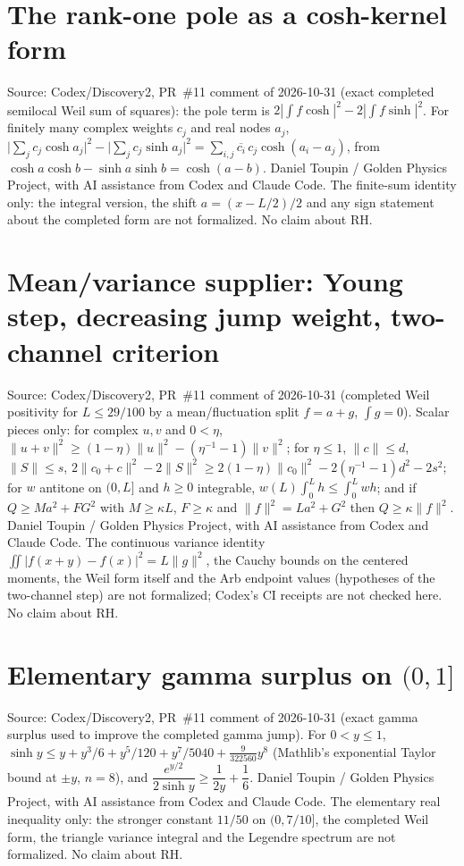 \documentclass{report}
\theoremstyle{definition}
\begin{document}
\begin{itemize}
\begin{itemize}
\section{The rank-one pole as a cosh-kernel form}
Source: Codex/Discovery2, PR~\#11 comment of 2026-10-31 (exact completed semilocal Weil sum of squares): the pole term is $2|\int f\cosh|^2-2|\int f\sinh|^2$. For finitely many complex weights $c_j$ and real nodes $a_j$,
$\bigl|\sum_j c_j\cosh a_j\bigr|^2-\bigl|\sum_j c_j\sinh a_j\bigr|^2=\sum_{i,j}\overline{c_i}\,c_j\cosh(a_i-a_j)$, from $\cosh a\cosh b-\sinh a\sinh b=\cosh(a-b)$.
Daniel Toupin / Golden Physics Project, with AI assistance from Codex and Claude Code. The finite-sum identity only: the integral version, the shift $a=(x-L/2)/2$ and any sign statement about the completed form are not formalized. No claim about RH.

\section{Mean/variance supplier: Young step, decreasing jump weight, two-channel criterion}
Source: Codex/Discovery2, PR~\#11 comment of 2026-10-31 (completed Weil positivity for $L\le 29/100$ by a mean/fluctuation split $f=a+g$, $\int g=0$). Scalar pieces only: for complex $u,v$ and $0<\eta$, $\|u+v\|^2\ge(1-\eta)\|u\|^2-(\eta^{-1}-1)\|v\|^2$; for $\eta\le1$, $\|c\|\le d$, $\|S\|\le s$, $2\|c_0+c\|^2-2\|S\|^2\ge 2(1-\eta)\|c_0\|^2-2(\eta^{-1}-1)d^2-2s^2$; for $w$ antitone on $(0,L]$ and $h\ge0$ integrable, $w(L)\int_0^L h\le\int_0^L wh$; and if $Q\ge Ma^2+FG^2$ with $M\ge\kappa L$, $F\ge\kappa$ and $\|f\|^2=La^2+G^2$ then $Q\ge\kappa\|f\|^2$.
Daniel Toupin / Golden Physics Project, with AI assistance from Codex and Claude Code. The continuous variance identity $\iint|f(x+y)-f(x)|^2=L\|g\|^2$, the Cauchy bounds on the centered moments, the Weil form itself and the Arb endpoint values (hypotheses of the two-channel step) are not formalized; Codex's CI receipts are not checked here. No claim about RH.

\section{Elementary gamma surplus on $(0,1]$}
Source: Codex/Discovery2, PR~\#11 comment of 2026-10-31 (exact gamma surplus used to improve the completed gamma jump). For $0<y\le 1$, $\sinh y\le y+y^3/6+y^5/120+y^7/5040+\tfrac{9}{322560}y^8$ (Mathlib's exponential Taylor bound at $\pm y$, $n=8$), and
$\dfrac{e^{y/2}}{2\sinh y}\ge\dfrac1{2y}+\dfrac16$.
Daniel Toupin / Golden Physics Project, with AI assistance from Codex and Claude Code. The elementary real inequality only: the stronger constant $11/50$ on $(0,7/10]$, the completed Weil form, the triangle variance integral and the Legendre spectrum are not formalized. No claim about RH.


\end{itemize}
\end{itemize}
\end{document}
